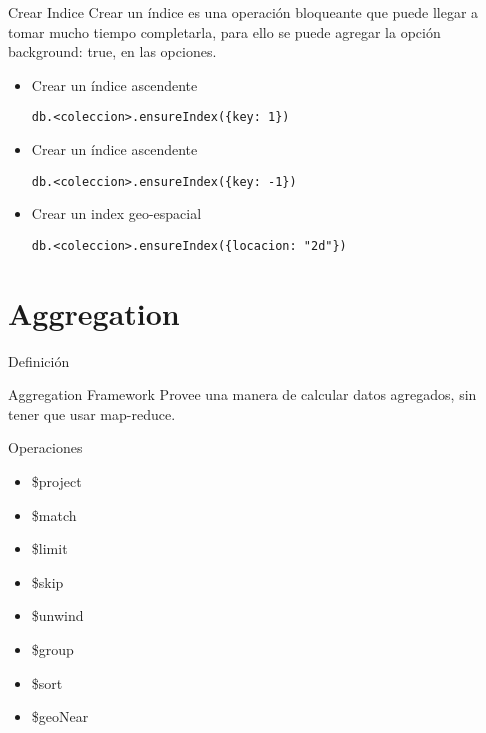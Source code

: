 \documentclass[12pt]{beamer}
\begin{document}
\begin{frame}[fragile]{Crear Indice}
  Crear un índice es una operación bloqueante que puede llegar a tomar
  mucho tiempo completarla, para ello se puede agregar la opción 
  {background: true}, en las opciones.

  \begin{itemize}
  \item Crear un índice ascendente
    \begin{verbatim}
db.<coleccion>.ensureIndex({key: 1})
    \end{verbatim}

  \item Crear un índice ascendente
    \begin{verbatim}
db.<coleccion>.ensureIndex({key: -1})
    \end{verbatim}


    \item Crear un index geo-espacial
    \begin{verbatim}
db.<coleccion>.ensureIndex({locacion: "2d"})
    \end{verbatim}
  \end{itemize}
\end{frame}


\section{Aggregation}
\begin{frame}{Definición}
\
\begin{block}{Aggregation Framework}
  Provee una manera de calcular datos agregados, sin tener que usar map-reduce.
\end{block}
\end{frame}

\begin{frame}{Operaciones}
  
  \begin{itemize}
    \item \$project
    \item \$match
    \item \$limit
    \item \$skip
    \item \$unwind
    \item \$group
    \item \$sort
    \item \$geoNear    
    \end{itemize}
\end{frame}
\end{document}
